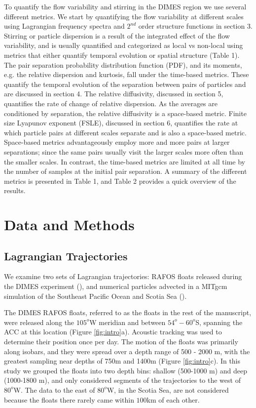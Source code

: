 \documentclass[]{ametsoc}
\begin{document}
To quantify the flow variability and stirring in the DIMES region we use several different metrics. We start by quantifying the flow variability at different scales using Lagrangian frequency spectra and $2^{nd}$ order structure functions in section 3. Stirring or particle dispersion is a result of the integrated effect of the flow variability, and is usually quantified and categorized as local vs non-local using metrics that either quantify temporal evolution or spatial structure (Table 1). The pair separation probability distribution function (PDF), and its moments, e.g. the relative dispersion and kurtosis, fall under the time-based metrics. These quantify the temporal evolution of the separation between pairs of particles and are discussed in section 4. The relative diffusivity, discussed in section 5, quantifies the rate of change of relative dispersion. As the averages are conditioned by separation, the relative diffusivity is a space-based metric. 
Finite size Lyapunov exponent (FSLE), discussed in section 6, quantifies the rate at which particle pairs at different scales separate and is also a space-based metric. 
Space-based metrics advantageously employ more and more pairs at larger separations; since the same pairs usually visit the larger scales more often than the smaller scales. In contrast, the time-based metrics are limited at all time by the number of samples at the initial pair separation.
A summary of the different metrics is presented in Table 1, and Table 2 provides a quick overview of the results.

\section{Data and Methods}
\subsection{Lagrangian Trajectories}
We examine two sets of Lagrangian trajectories: RAFOS floats released during the DIMES experiment (\cite{balwada2016}), and numerical particles advected in a MITgcm simulation of the Southeast Pacific Ocean and Scotia Sea  (\cite{lacasce2014}). 

The DIMES RAFOS floats, referred to as the floats in the rest of the manuscript, were released along the $105^o$W meridian and between $54^o - 60^o$S, spanning the ACC at this location (Figure \ref{fig:intro}a). Acoustic tracking was used to determine their position once per day. The motion of the floats was primarily along isobars, and they were spread over a depth range of 500 - 2000 m, with the greatest sampling near depths of 750m and 1400m (Figure \ref{fig:intro}c). In this study we grouped the floats into two depth bins: shallow (500-1000 m) and deep (1000-1800 m), and only considered segments of the trajectories to the west of $80^o$W. The data to the east of $80^o$W, in the Scotia Sea, are not considered because the floats there rarely came within $100$km of each other.
\end{document}
